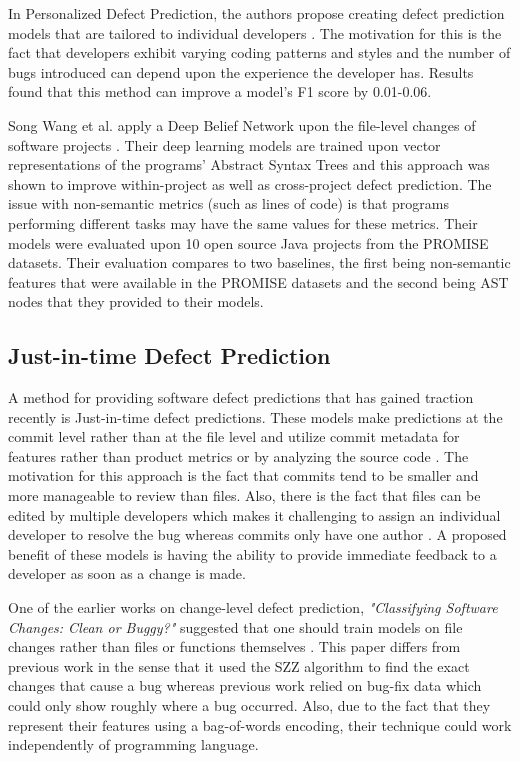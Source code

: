 \documentclass[../main.tex]{subfiles}
\begin{document}
In Personalized Defect Prediction, the authors propose creating defect prediction models that are tailored to individual developers \cite{jiang2013personalized}. The motivation for this is the fact that developers exhibit varying coding patterns and styles and the number of bugs introduced can depend upon the experience the developer has. Results found that this method can improve a model's F1 score by 0.01-0.06.

Song Wang et al. apply a Deep Belief Network upon the file-level changes of software projects \cite{wang2016automatically}. Their deep learning models are trained upon vector representations of the programs' Abstract Syntax Trees and this approach was shown to improve within-project as well as cross-project defect prediction. The issue with non-semantic metrics (such as lines of code) is that programs performing different tasks may have the same values for these metrics. Their models were evaluated upon 10 open source Java projects from the PROMISE datasets. Their evaluation compares to two baselines, the first being non-semantic features that were available in the PROMISE datasets and the second being AST nodes that they provided to their models. 


\subsection{Just-in-time Defect Prediction}

A method for providing software defect predictions that has gained traction recently is Just-in-time defect predictions. These models make predictions at the commit level rather than at the file level and utilize commit metadata for features rather than product metrics or by analyzing the source code \cite{kamei2013large}. The motivation for this approach is the fact that commits tend to be smaller and more manageable to review than files. Also, there is the fact that files can be edited by multiple developers which makes it challenging to assign an individual developer to resolve the bug whereas commits only have one author \cite{kamei2013large}. A proposed benefit of these models is having the ability to provide immediate feedback to a developer as soon as a change is made. 

One of the earlier works on change-level defect prediction, \textit{"Classifying Software Changes: Clean or Buggy?"} suggested that one should train models on file changes rather than files or functions themselves \cite{kim2008classifying}. This paper differs from previous work in the sense that it used the SZZ algorithm to find the exact changes that cause a bug whereas previous work relied on bug-fix data which could only show roughly where a bug occurred. Also, due to the fact that they represent their features using a bag-of-words encoding, their technique could work independently of programming language. 
\end{document}
